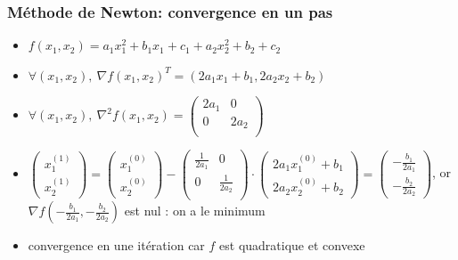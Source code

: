 \documentclass{beamer}
\begin{document}
\begin{frame}
  \frametitle{Méthode de Newton: convergence en un pas}

  \begin{itemize}
  \item $f(x_1,x_2) = a_1x_1^2 + b_1x_1 + c_1 + a_2x_2^2 + b_2 + c_2$
  \item %
    $\forall (x_1,x_2), \ {\nabla f}(x_1,x_2)^T = (2a_1x_1 + b_1,2a_2x_2 + b_2)$
  \item %
  $ \forall (x_1,x_2), \ \nabla^2f(x_1,x_2) =
  \left(\begin{array}{cc}
    2a_1 & 0 \\
    0 & 2a_2 \\
  \end{array}
  \right)
  $
  \end{itemize}

  \begin{itemize}
  \item $\left( \begin{array}{c} x_1^{(1)} \\ x_2^{(1)} \end{array} \right ) =
    \left( \begin{array}{c} x_1^{(0)} \\ x_2^{(0)} \end{array} \right ) -
  \left(\begin{array}{cc} \frac{1}{2a_1} & 0 \\ 0 & \frac{1}{2a_2} \\ \end{array} \right) \cdot
  \left( \begin{array}{c} 2a_1x_1^{(0)} + b_1 \\ 2a_2x_2^{(0)} + b_2 \end{array} \right ) =
  \left( \begin{array}{c} -\frac{b_1}{2a_1} \\ -\frac{b_2}{2a_2} \end{array} \right ) $, or
  ${\nabla f}(-\frac{b_1}{2a_1}, -\frac{b_2}{2a_2})$ est nul : on a le minimum
  \item \alert{convergence en une itération car $f$ est quadratique et convexe}
  \end{itemize}
  
\end{frame}
\end{document}
